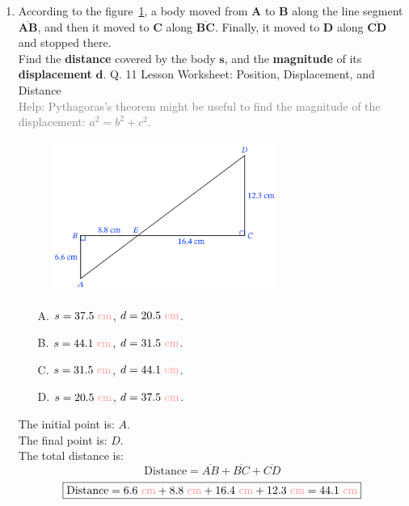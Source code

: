 \documentclass[A4,12pt]{article}
\begin{document}
\begin{enumerate}[label=\bfseries (\arabic*)]
\item According to the figure~\ref{acc}, a body moved from $\bm A$ to $\bm B$ along the line segment $\bm {\overline{AB}}$, and then it moved to $\bm C$ along $\bm {\overline{BC}}$. Finally, it moved to $\bm D$ along $\bm {\overline{CD}}$ and stopped there.\\
Find the \textbf{distance} covered by the body $\bm s$, and the \textbf{magnitude} of its \textbf{displacement} $\bm d$. \cite{Nagwa} Q. 11 Lesson Worksheet: Position, Displacement, and Distance\\
\textcolor{gray}{Help: Pythagoras's theorem might be useful to find the magnitude of the displacement: $a^2=b^2+c^2$.}
%
\begin{figure}[H]
    \centering
    \includegraphics[width=0.7\textwidth]{Nagwa_Q11_D.png}
    \caption{}
    \label{acc}
\end{figure}
%
\begin{multicols}{2}
\begin{itemize}
    \item[A.] $s=\cmcgs{37.5}$, $d=\cmcgs{20.5}$.
    \item[B.] $s=\cmcgs{44.1}$, $d=\cmcgs{31.5}$.
    \item[C.] $s=\cmcgs{31.5}$, $d=\cmcgs{44.1}$.
    \item[D.] $s=\cmcgs{20.5}$, $d=\cmcgs{37.5}$.
\end{itemize}
\end{multicols}
%
\begin{example}
The initial point is: $A$.\\
The final point is: $D$.\\
The total distance is:
\begin{equation*}
    \text{Distance}=\overline{AB}+\overline{BC}+\overline{CD}
\end{equation*}
\begin{equation*}
    \boxed{\text{Distance}=\cmcgs{6.6}+\cmcgs{8.8}+\cmcgs{16.4}+\cmcgs{12.3}=\cmcgs{44.1}}

\end{equation*}
\end{example}
\end{enumerate}
\end{document}
